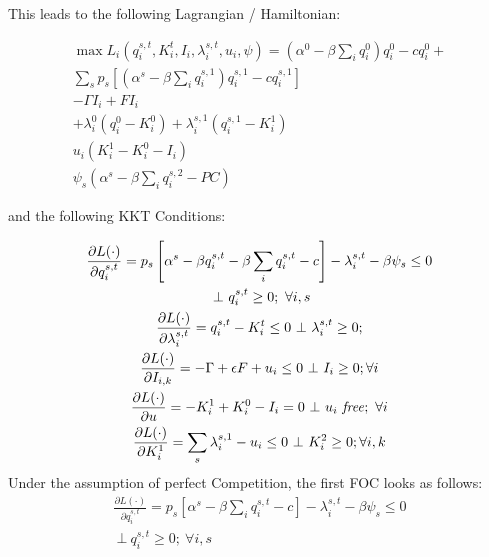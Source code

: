 \documentclass[a4paper,12pt]{article}
\theoremstyle{remark}
\begin{document}
This leads to the following Lagrangian / Hamiltonian:

\begin{gather}
	\max L_i(q_{i}^{s,t},K^t_{i},I_{i},\lambda_{i}^{s,t},u_{i}, \psi)= (\alpha^0-\beta \sum_i q_{i}^{0}) q_{i}^{0} - c q_{i}^{0}	+ \\  \nonumber 
	 \sum_s p_s \left[(\alpha^s- \beta \sum_i q_{i}^{s,1}) q_{i}^{s,1} - c q_{i}^{s,1}  \right] \\  \nonumber 
		- \Gamma I_{i} +  F I_{i}  \\ \nonumber  
	  	+ \lambda_{i}^{0}(q_{i}^{0} - K^{0}_{i})+ \lambda_{i}^{s,1}(q_{i}^{s,1} - K^{1}_{i}) \\ \nonumber
							u_{i}(K^{1}_{i}  - K^{0}_{i}  - I_{i})		\\   \nonumber
							\psi_s (\alpha^s - \beta  \sum_i q_i^{s,2} - PC )
\end{gather}

and the following KKT Conditions:

\begin{gather}
\frac{\partial L(\cdot)}{\partial q_{i}^{s,t}} = p_s \left[ \alpha^s - \beta q_{i}^{s,t} - \beta \sum_i q_{i}^{s,t} - c \right] - \lambda_{i}^{s,t} - \beta \psi_s \leq 0 \\ \nonumber \ \bot \ q_{i}^{s,t} \geq 0;\ \forall i,s \\
\frac{\partial L(\cdot)}{\partial \lambda_{i}^{s,t}} = q_{i}^{s,t} - K^t_{i} \leq 0 \ \bot \ \lambda_{i}^{s,t} \geq 0 ; \\
\frac{\partial L(\cdot)}{\partial I_{i,k}} = - \Gamma + \epsilon F + u_{i} \leq 0 \ \bot \ I_{i} \geq 0 ;\forall i \\
\frac{\partial L(\cdot)}{\partial u} = -K^1_{i} +  K^0_{i} - I_{i}  = 0 \ \bot \ u_{i} \ \mbox{\textit{free}}; \  \forall i  \\
\frac{\partial L(\cdot)}{\partial K^1_{i}} = \sum_s  \lambda_{i}^{s,1} - u_{i} \leq 0  \ \bot \ K^2_{i} \geq 0 ; \forall i,k
\end{gather}
Under the assumption of perfect Competition, the first FOC looks as follows:
\begin{gather}
\frac{\partial L(\cdot)}{\partial q_{i}^{s,t}} = p_s \left[ \alpha^s -  \beta \sum_i q_{i}^{s,t} - c \right] - \lambda_{i}^{s,t} - \beta \psi_s \leq 0 \\ \nonumber \ \bot \ q_{i}^{s,t} \geq 0;\ \forall i,s \\
\end{gather}
\end{document}
